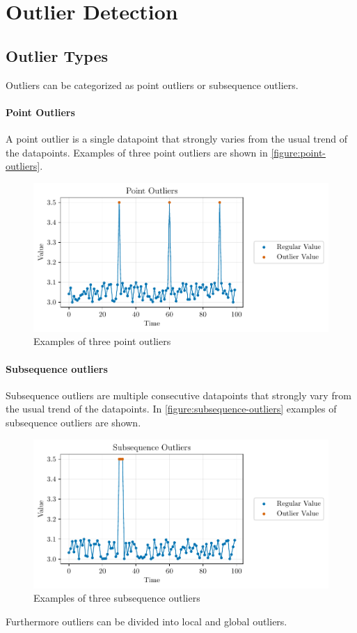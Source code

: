 \chapter{Outlier Detection}
\section{Outlier Types}\label{section:outlier-detection}
Outliers can be categorized as point outliers or subsequence outliers.
\subsubsection{Point Outliers}
A point outlier is a single datapoint that strongly varies from the usual trend of the datapoints. \cite{blazquez-garciaReviewOutlierAnomaly2020} Examples of three point outliers are shown in \autoref{figure:point-outliers}.
\begin{figure}[h]
  \centering
  \includegraphics{./plots/pdfs/point_outliers.pdf}
  \caption{Examples of three point outliers}
  \label{figure:point-outliers}
\end{figure}

\subsubsection{Subsequence outliers}
Subsequence outliers are multiple consecutive datapoints that strongly vary from the usual trend of the datapoints. \cite{blazquez-garciaReviewOutlierAnomaly2020} In \autoref{figure:subsequence-outliers} examples of subsequence outliers are shown.
\newline\newline
\begin{figure}[h]
  \centering
  \includegraphics{./plots/pdfs/subsequence_outliers.pdf}
  \caption{Examples of three subsequence outliers}
  \label{figure:subsequence-outliers}
\end{figure}
Furthermore outliers can be divided into local and global outliers. 
